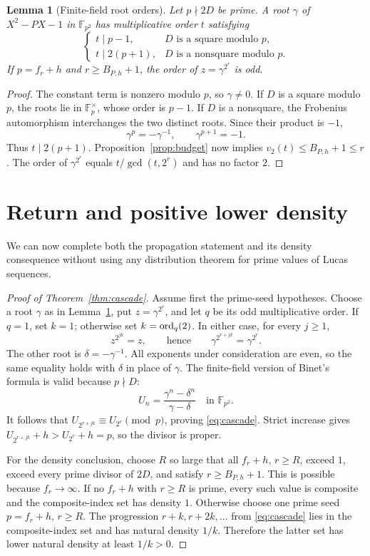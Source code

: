 \documentclass[11pt,a4paper]{article}
\newtheorem{lemma}[theorem]{Lemma}
\theoremstyle{definition}\newtheorem{definition}[theorem]{Definition}
\theoremstyle{remark}\newtheorem{remark}[theorem]{Remark}
\newcommand{\Fq}{\mathbb F}
\begin{document}
\begin{lemma}[Finite-field root orders]\label{lem:orders}
Let $p\nmid2D$ be prime. A root $\gamma$ of $X^2-PX-1$ in
$\Fq_{p^2}$ has multiplicative order $t$ satisfying
\[
 \begin{cases}
 t\mid p-1,&D\text{ is a square modulo }p,\\
 t\mid2(p+1),&D\text{ is a nonsquare modulo }p.
 \end{cases}
\]
If $p=f_r+h$ and $r\ge B_{P,h}+1$, the order of
$z=\gamma^{2^r}$ is odd.
\end{lemma}
\begin{proof}
The constant term is nonzero modulo $p$, so $\gamma\ne0$.
If $D$ is a square modulo $p$, the roots lie in $\Fq_p^\times$,
whose order is $p-1$. If $D$ is a nonsquare, the Frobenius automorphism
interchanges the two distinct roots. Since their product is $-1$,
\[
 \gamma^p=-\gamma^{-1},\qquad \gamma^{p+1}=-1.
\]
Thus $t\mid2(p+1)$. Proposition~\ref{prop:budget} now implies
$v_2(t)\le B_{P,h}+1\le r$. The order of $\gamma^{2^r}$ equals
$t/\gcd(t,2^r)$ and has no factor $2$.
\end{proof}

\section{Return and positive lower density}
We can now complete both the propagation statement and its density
consequence without using any distribution theorem for prime values
of Lucas sequences.

\begin{proof}[Proof of Theorem~\ref{thm:cascade}]
Assume first the prime-seed hypotheses. Choose a root $\gamma$ as in
Lemma~\ref{lem:orders}, put $z=\gamma^{2^r}$, and let $q$ be its odd
multiplicative order. If $q=1$, set $k=1$; otherwise set
$k=\operatorname{ord}_q(2)$. In either case, for every $j\ge1$,
\[
 z^{2^{jk}}=z,
 \qquad\text{hence}\qquad
 \gamma^{2^{r+jk}}=\gamma^{2^r}.
\]
The other root is $\delta=-\gamma^{-1}$. All exponents under
consideration are even, so the same equality holds with $\delta$ in
place of $\gamma$. The finite-field version of Binet's formula is
valid because $p\nmid D$:
\[
 U_n=\frac{\gamma^n-\delta^n}{\gamma-\delta}
 \quad\text{in }\Fq_{p^2}.
\]
It follows that $U_{2^{r+jk}}\equiv U_{2^r}\pmod p$, proving
\eqref{eq:cascade}. Strict increase gives
$U_{2^{r+jk}}+h>U_{2^r}+h=p$, so the divisor is proper.

For the density conclusion, choose $R$ so large that all $f_r+h$,
$r\ge R$, exceed $1$, exceed every prime divisor of $2D$, and satisfy
$r\ge B_{P,h}+1$. This is possible because $f_r\to\infty$.
If no $f_r+h$ with $r\ge R$ is prime, every such value is composite
and the composite-index set has density $1$. Otherwise choose one
prime seed $p=f_r+h$, $r\ge R$. The progression
$r+k,r+2k,\ldots$ from \eqref{eq:cascade} lies in the composite-index
set and has natural density $1/k$. Therefore the latter set has lower
natural density at least $1/k>0$.
\end{proof}
\end{document}
